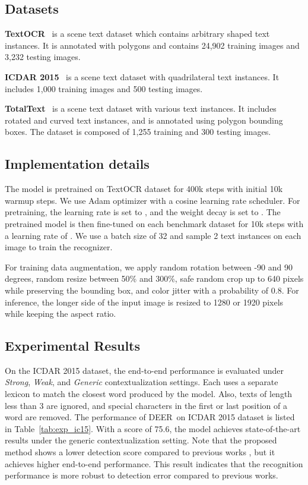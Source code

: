 \documentclass[10pt,twocolumn,letterpaper]{article}
\newcommand{\Table}[1]{Table~\ref{tab:#1}}
\newcommand{\methodname}[0]{DEER}
\begin{document}
\subsection{Datasets}

\noindent\textbf{TextOCR}~\cite{singh2021textocr} is a scene text dataset which contains arbitrary shaped text instances. It is annotated with polygons and contains 24,902 training images and 3,232 testing images.

\noindent\textbf{ICDAR 2015}~\cite{IC15} is a scene text dataset with quadrilateral text instances. It includes 1,000 training images and 500 testing images.

\noindent\textbf{TotalText}~\cite{ch2017total} is a scene text dataset with various text instances. It includes rotated and curved text instances, and is annotated using polygon bounding boxes. The dataset is composed of 1,255 training and 300 testing images.

\subsection{Implementation details}
The model is pretrained on TextOCR dataset for 400k steps with initial 10k warmup steps. We use Adam optimizer with a cosine learning rate scheduler. For pretraining, the learning rate is set to , and the weight decay is set to .  The pretrained model is then fine-tuned on each benchmark dataset for 10k steps with a learning rate of . We use a batch size of 32 and sample 2 text instances on each image to train the recognizer.



For training data augmentation, we apply random rotation between -90 and 90 degrees, random resize between 50\%  and 300\%, safe random crop up to 640 pixels while preserving the bounding box, and color jitter with a probability of 0.8. For inference, the longer side of the input image is resized to 1280 or 1920 pixels while keeping the aspect ratio.




\subsection{Experimental Results}

On the ICDAR 2015 dataset, the end-to-end performance is evaluated under \textit{Strong}, \textit{Weak}, and \textit{Generic} contextualization settings. Each uses a separate lexicon to match the closest word produced by the model. Also, texts of length less than 3 are ignored, and special characters in the first or last position of a word are removed. The performance of \methodname~on ICDAR 2015 dataset is listed in \Table{exp_ic15}. With a score of 75.6, the model achieves state-of-the-art results under the generic contextualization setting. Note that the proposed method shows a lower detection score compared to previous works \cite{wang2021towards,xing2019convolutional}, but it achieves higher end-to-end performance. This result indicates that the recognition performance is more robust to detection error compared to previous works.
\end{document}
